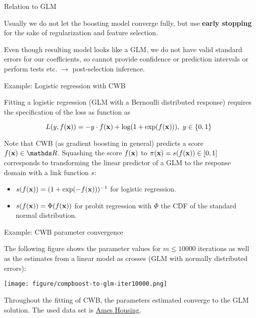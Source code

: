 \documentclass[11pt,compress,t,notes=noshow, xcolor=table]{beamer}
\begin{document}
\begin{vbframe}{Relation to GLM}
\lz

Usually we do not let the boosting model converge fully, but use \textbf{early stopping} for the sake of regularization and feature selection.

\lz

Even though resulting model looks like a GLM, we do not have valid standard
errors for our coefficients,
so cannot provide confidence or prediction intervals or perform tests etc.
$\rightarrow$ post-selection inference.

\end{vbframe}


\begin{vbframe}{Example: Logistic regression with CWB}

Fitting a logistic regression (GLM with a Bernoulli distributed response) requires the specification of the loss as function as

$$
  L(y, f(\mathbf{x})) = -y \cdot f(\mathbf{x}) + \log (1 + \exp(f(\mathbf{x}))),\ y\in\{0, 1\}
$$

Note that CWB (as gradient boosting in general) predicts a score $\fx \in \R$. Squashing the score $f(\mathbf{x})$ to $\pi(\mathbf{x}) = s(f(\mathbf{x})) \in [0,1]$ corresponds to transforming the linear predictor of a GLM to the response domain with a link function $s$:

\begin{itemize}
  \item $s(f(\mathbf{x})) = (1 + \exp(-f(\mathbf{x})))^{-1}$ for logistic regression.
  \item $s(f(\mathbf{x})) = \Phi(f(\mathbf{x}))$ for probit regression with $\Phi$ the CDF of the standard normal distribution.
\end{itemize}

\end{vbframe}



\begin{vbframe}{Example: CWB parameter convergence}

The following figure shows the parameter values for $m \leq 10000$ iterations as well as the estimates from a linear model as crosses (GLM with normally distributed errors):

\begin{center}
\texttt{[image: figure/compboost-to-glm-iter10000.png]}
\end{center}

Throughout the fitting of CWB, the parameters estimated converge to the GLM solution. The used data set is \href{https://github.com/topepo/AmesHousing}{Ames Housing}.

\end{vbframe}


\endlecture
\end{document}
